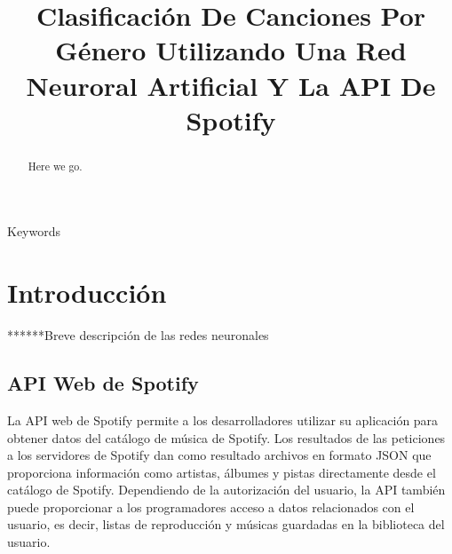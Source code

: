 \documentclass[conference]{IEEEtran}
\begin{document}
\title{  Clasificación De Canciones Por Género Utilizando Una Red Neuroral Artificial Y La API De Spotify }
\author{

\and
{}
}

\maketitle
\renewcommand\abstractname{Abstract}
\begin{abstract}
Here we go. \\
\end{abstract}

\begin{IEEEkeywords}
Keywords
\end{IEEEkeywords}

\IEEEpeerreviewmaketitle
\section{Introducci\'on}

******Breve descripción de las redes neuronales\\

\subsection{API Web de Spotify \\}
La API web de Spotify permite a los desarrolladores utilizar su aplicación para obtener datos del catálogo de música de Spotify. Los resultados de las peticiones a los servidores de Spotify dan como resultado archivos en formato JSON que proporciona información como artistas, álbumes y pistas directamente desde el catálogo de Spotify. Dependiendo de la autorización del usuario, la API también puede proporcionar a los programadores acceso a datos relacionados con el usuario, es decir, listas de reproducción y músicas guardadas en la biblioteca del usuario.\\
\end{document}
